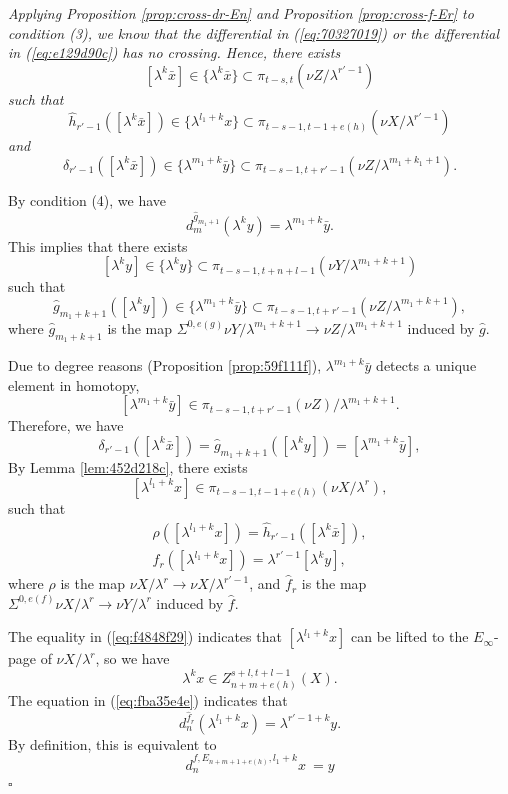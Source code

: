 \documentclass[12pt,a4paper]{article}
\renewenvironment{proof}{{\noindent\it\textbf{Proof}}\quad\it}{\hfill$\square$}
\newcommand{\Sus}{\Sigma}
\begin{document}
\begin{sloppy}
\begin{proof}
    Applying Proposition \ref{prop:cross-dr-En} and Proposition \ref{prop:cross-f-Er} to condition (3), we know that the differential in (\ref{eq:70327019}) or the differential in (\ref{eq:e129d90c}) has no crossing. Hence, there exists
    $$[\lambda^{k}\bar x]\in \{\lambda^{k}\bar x\}\subset \pi_{t-s,t}(\nu Z/\lambda^{r'-1})$$
    such that
    $$\hat h_{r'-1}([\lambda^{k}\bar x])\in \{\lambda^{l_1+k}x\}\subset \pi_{t-s-1, t-1+e(h)}(\nu X/\lambda^{r'-1})$$
    and
    $$\delta_{r'-1}([\lambda^{k}\bar x])\in \{\lambda^{m_1+k}\bar y\}\subset \pi_{t-s-1,t+r'-1}(\nu Z/\lambda^{m_1+k_1+1}).$$

    By condition (4), we have
    \begin{equation*}
        d^{\hat g_{m_1+1}}_m(\lambda^{k}y)=\lambda^{m_1+k}\bar y.
    \end{equation*}
    This implies that there exists
    $$[\lambda^{k}y]\in \{\lambda^{k}y\}\subset \pi_{t-s-1,t+n+l-1}(\nu Y/\lambda^{m_1+k+1})$$
    such that
    $$\hat g_{m_1+k+1}([\lambda^{k}y])\in \{\lambda^{m_1+k}\bar y\}\subset \pi_{t-s-1, t+r'-1}(\nu Z/\lambda^{m_1+k+1}),$$
    where $\hat g_{m_1+k+1}$ is the map $\Sus^{0,e(g)}\nu Y/\lambda^{m_1+k+1}\to \nu Z/\lambda^{m_1+k+1}$ induced by $\hat g$.

    Due to degree reasons (Proposition \ref{prop:59f111f}), $\lambda^{m_1+k}\bar y$ detects a unique element in homotopy,
    $$[\lambda^{m_1+k}\bar y]\in \pi_{t-s-1, t+r'-1}(\nu Z)/\lambda^{m_1+k+1}.$$
    Therefore, we have
    $$\delta_{r'-1}([\lambda^k\bar x])=\hat g_{m_1+k+1}([\lambda^ky])=[\lambda^{m_1+k}\bar y],$$
    By Lemma \ref{lem:452d218c}, there exists
    $$[\lambda^{l_1+k}x]\in \pi_{t-s-1,t-1+e(h)}(\nu X/\lambda^r),$$
    such that
    \begin{gather}
        \rho ([\lambda^{l_1+k}x])=\hat h_{r'-1}([\lambda^k\bar x]),\label{eq:f4848f29}\\
        \hat f_r([\lambda^{l_1+k}x])=\lambda^{r'-1}[\lambda^ky],\label{eq:fba35e4e}
    \end{gather}
    where $\rho$ is the map $\nu X/\lambda^r\to \nu X/\lambda^{r'-1}$, and $\hat f_r$ is the map $\Sus^{0,e(f)}\nu X/\lambda^r\to \nu Y/\lambda^r$ induced by $\hat f$.

    The equality in (\ref{eq:f4848f29}) indicates that $[\lambda^{l_1+k}x]$ can be lifted to the $E_\infty$-page of $\nu X/\lambda^r$, so we have
    $$\lambda^kx\in Z_{n+m+e(h)}^{s+l,t+l-1}(X).$$
    The equation in (\ref{eq:fba35e4e}) indicates that
    $$d^{\hat f_r}_n(\lambda^{l_1+k}x)=\lambda^{r'-1+k}y.$$
    By definition, this is equivalent to
    $$d^{f, E_{n+m+1+e(h)}, l_1+k}_nx\ = y $$
\end{proof}


\end{sloppy}
\end{document}
